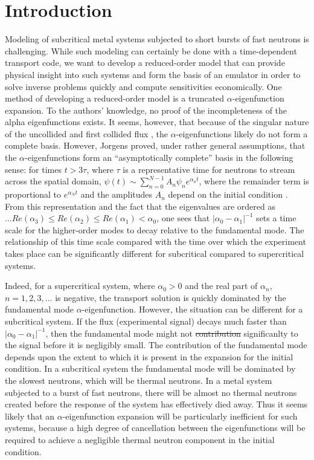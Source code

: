 \documentclass{style/nseJournal}
\providecommand{\DIFadd}[1]{{\protect\color{blue}\uwave{#1}}} %
\providecommand{\DIFdel}[1]{{\protect\color{red}\sout{#1}}}                      %
\providecommand{\DIFaddbegin}{} %
\providecommand{\DIFaddend}{} %
\providecommand{\DIFdelbegin}{} %
\providecommand{\DIFdelend}{} %
\begin{document}
\section{Introduction}
Modeling of subcritical metal systems subjected to short bursts of fast neutrons is challenging.  
While such modeling can certainly be done with a time-dependent transport code, we want to develop a reduced-order model that can provide physical insight into such systems and form the basis of an emulator in order to solve inverse problems quickly and compute sensitivities economically.  
One method of developing a reduced-order model is a truncated $\alpha$-eigenfunction expansion.  
To the authors' knowledge, no proof of the incompleteness of the alpha eigenfunctions exists.  
It seems, however, that because of the singular nature of the uncollided and first collided flux \cite{bondarenko1998structure} \cite{larsen1975solutions}, the $\alpha$-eigenfunctions likely do not form a complete basis.  
However, Jorgens proved, under rather general assumptions, that the $\alpha$-eigenfunctions form an ``asymptotically complete'' basis in the following sense: for times $t>3\tau$, where $\tau$ is a representative time for neutrons to stream across the spatial domain, $\psi\left(t\right) \sim \sum_{n=0}^{N-1} A_n \psi_n e^{\alpha_n t}$, where the remainder term is proportional to $e^{\alpha_N t}$ and the amplitudes $A_n$ depend on the initial condition \cite{jorgens1958asymptotic}.  
From this representation and the fact that the eigenvalues are ordered as $...Re\left(\alpha_3\right)\le Re\left(\alpha_2\right)\le  Re\left(\alpha_1\right) < \alpha_0$, one sees that $|\alpha_0 - \alpha_1|^{-1}$ sets a time scale for the higher-order modes to decay relative to the fundamental mode.  
The relationship of this time scale compared with the time over which the experiment takes place can be significantly different for subcritical compared to supercritical systems.  

Indeed, for a supercritical system, where $\alpha_0 > 0$ and the real part of $\alpha_n$, $n=1,2,3,...$ is negative, the transport solution is quickly dominated by the fundamental mode $\alpha$-eigenfunction.  
However, the situation can be different for a subcritical system.  
If the flux (experimental signal) decays much faster than $|\alpha_0 - 
\alpha_1|^{-1}$, then the fundamental mode might not \DIFdelbegin \DIFdel{contribution }\DIFdelend \DIFaddbegin \DIFadd{contribute }\DIFaddend significanlty 
to the signal before it is negligibly small.  
The contribution of the fundamental mode depends upon the extent to which it is present in the expansion for the initial condition.  
In a subcritical system the fundamental mode will be dominated by the slowest neutrons, which will be thermal neutrons.  
In a metal system subjected to a burst of fast neutrons, there will be almost no thermal neutrons created before the response of the system has effectively died away.  
Thus it seems likely that an $\alpha$-eigenfunction expansion will be particularly inefficient for such systems, because a high degree of cancellation between the eigenfunctions will be required to achieve a negligible thermal neutron component in the initial condition.  
\end{document}
